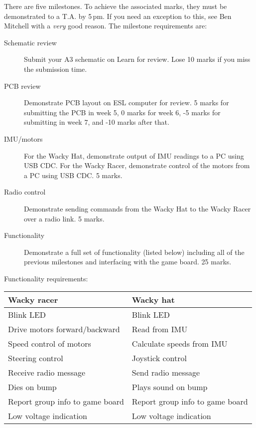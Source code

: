 \documentclass[11pt, a4paper]{article}
\begin{document}
There are five milestones.  To achieve the associated marks, they must be
demonstrated to a T.A. by 5\,pm. If you need an exception to this, see Ben
Mitchell with a \emph{very} good reason.  The milestone requirements are:
%
\begin{description}
\item [Schematic review] Submit your A3 schematic on Learn for review. Lose 10
  marks if you miss the submission time.

\item [PCB review] Demonstrate PCB layout on ESL computer for review.
  5 marks for submitting the PCB in week 5, 0 marks for week 6, -5 marks for
  submitting in week 7, and -10 marks after that. 

\item [IMU/motors] For the Wacky Hat, demonstrate output of IMU
  readings to a PC using USB CDC.  For the Wacky Racer, demonstrate
  control of the motors from a PC using USB CDC.  5 marks.

\item[Radio control] Demonstrate sending commands from the Wacky Hat
  to the Wacky Racer over a radio link.  5 marks.

\item[Functionality] Demonstrate a full set of functionality (listed below)
  including all of the previous milestones and interfacing with the game board. 25 marks.
\end{description}

Functionality requirements:
\begin{flushleft}
  \begin{tabular}{l|l}
    Wacky racer & Wacky hat \\ \hline \hline
    Blink LED                      & Blink LED \\
    Drive motors forward/backward  & Read from IMU \\
    Speed control of motors        & Calculate speeds from IMU \\
    Steering control               & Joystick control \\
    Receive radio message          & Send radio message \\
    Dies on bump                   & Plays sound on bump \\
    Report group info to game board & Report group info to game board \\
    Low voltage indication         & Low voltage indication \\
  \end{tabular}
\end{flushleft}
\end{document}

